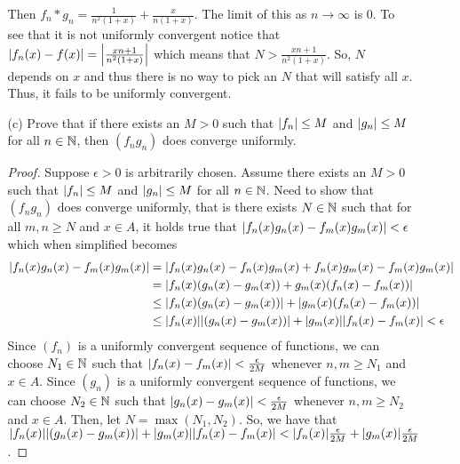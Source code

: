 \documentclass[12pt,letterpaper]{article}
\begin{document}
\begin{itemize}[leftmargin=!,labelindent=5pt]
\begin{itemize}
                    Then $f_n * g_n = \frac{1}{n^2(1+x)} + \frac{x}{n(1+x)}$.
                    The limit of this as $n \to \infty$ is $0$.
                    To see that it is not uniformly convergent notice that $\abs{f_n(x) - f(x)} = \abs{\frac{xn+1}{n^2(1+x)}}$ which means that $N > \frac{xn+1}{n^2(1+x)}$.
                    So, $N$ depends on $x$ and thus there is no way to pick an $N$ that will satisfy all $x$.
                    Thus, it fails to be uniformly convergent.
                \item [(c)] Prove that if there exists an $M > 0$ such that $\abs{f_n}\leq M$ and $\abs{g_n} \leq M$ for all $n \in \mathbb{N}$, then $(f_n g_n)$ does converge uniformly.
                    \begin{proof}
                        Suppose $\epsilon > 0$ is arbitrarily chosen.
                        Assume there exists an $M > 0$ such that $\abs{f_n}\leq M$ and $\abs{g_n} \leq M$ for all $n \in \mathbb{N}$.
                        Need to show that $(f_n g_n)$ does converge uniformly, that is there exists $N \in \mathbb{N}$ such that for all $m,n \geq N$ and $x\in A$, it holds true that $\abs{f_n(x)g_n(x) - f_m(x)g_m(x)} < \epsilon$ which when simplified becomes
                        \begin{align*}
                            \abs{f_n(x)g_n(x) - f_m(x)g_m(x)} &= \abs{f_n(x)g_n(x) - f_n(x)g_m(x) + f_n(x)g_m(x) - f_m(x)g_m(x)}\\
                            &= \abs{f_n(x)(g_n(x) - g_m(x)) + g_m(x) (f_n(x) - f_m(x))}\\
                            &\leq \abs{f_n(x)(g_n(x) - g_m(x))} + \abs{g_m(x) (f_n(x) - f_m(x))}\\
                            &\leq \abs{f_n(x)}\abs{(g_n(x) - g_m(x))} + \abs{g_m(x)}\abs{f_n(x) - f_m(x)} < \epsilon
                        \end{align*}
                        Since $(f_n)$ is a uniformly convergent sequence of functions, we can choose $N_1 \in \mathbb{N}$ such that $\abs{f_n(x) - f_m(x)} < \frac{\epsilon}{2M}$ whenever $n,m \geq N_1$ and $x \in A$.
                        Since $(g_n)$ is a uniformly convergent sequence of functions, we can choose $N_2 \in \mathbb{N}$ such that $\abs{g_n(x) - g_m(x)} < \frac{\epsilon}{2M}$ whenever $n,m \geq N_2$ and $x \in A$.
                        Then, let $N = \max(N_1, N_2)$.
                        So, we have that $\abs{f_n(x)}\abs{(g_n(x) - g_m(x))} + \abs{g_m(x)}\abs{f_n(x) - f_m(x)} < \abs{f_n(x)}\frac{\epsilon}{2M} + \abs{g_m(x)}\frac{\epsilon}{2M}$.

\end{proof}
\end{itemize}
\end{itemize}
\end{document}
